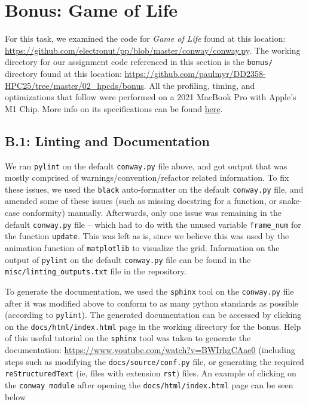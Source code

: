 \documentclass[a4paper,12pt]{article}
\begin{document}
\section{Bonus: Game of Life}
For this task, we examined the code for \textit{Game of Life} found at this location: \url{https://github.com/electronut/pp/blob/master/conway/conway.py}. The working directory for our assignment code referenced in this section is the \verb|bonus/| directory found at this location: \url{https://github.com/paulmyr/DD2358-HPC25/tree/master/02_hpcds/bonus}. All the profiling, timing, and optimizations that follow were performed on a 2021 MacBook Pro with Apple's M1 Chip. More info on its specifications can be found \href{https://support.apple.com/en-us/111901}{here}.
\subsection{B.1: Linting and Documentation}
We ran \verb|pylint| on the default \verb|conway.py| file above, and got output that was mostly comprised of warnings/convention/refactor related information. To fix these issues, we used the \verb|black| auto-formatter on the default \verb|conway.py| file, and amended some of these issues (such as missing docstring for a function, or snake-case conformity) manually. Afterwards, only one issue was remaining in the default \verb|conway.py| file -- which had to do with the unused variable \verb|frame_num| for the function \verb|update|. This was left as is, since we believe this was used by the animation function of \verb|matplotlib| to visualize the grid. Information on the output of \verb|pylint| on the default \verb|conway.py| file can be found in the \verb|misc/linting_outputs.txt| file in the repository. 

To generate the documentation, we used the \verb|sphinx| tool on the \verb|conway.py| file after it was modified above to conform to as many python standards as possible (according to \verb|pylint|). The generated documentation can be accessed by clicking on the \verb|docs/html/index.html| page in the working directory for the bonus. Help of this useful tutorial on the \verb|sphinx| tool was taken to generate the documentation: \url{https://www.youtube.com/watch?v=BWIrhgCAae0} (including steps such as modifying the \verb|docs/source/conf.py| file, or generating the required \verb|reStructuredText| (ie, files with extension \verb|rst|) files. An example of clicking on the \verb|conway module| after opening the \verb|docs/html/index.html| page can be seen below
\end{document}
